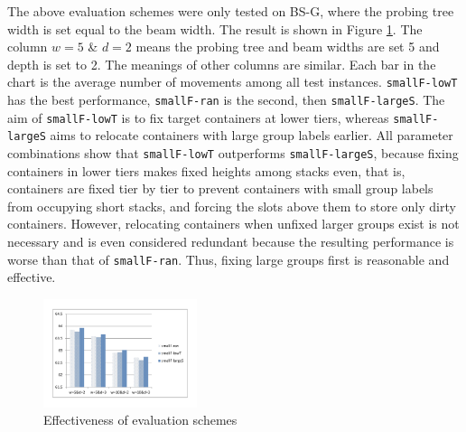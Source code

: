 \documentclass[review,3p,times,authoryear,12pt]{elsarticle}
\begin{document}
The above evaluation schemes were only tested on BS-G, where the probing tree width is set equal to the beam width. The result is shown in Figure \ref{fig7}. The column $w=5$ \& $d=2$ means the probing tree and beam widths are set 5 and depth is set to 2. The meanings of other columns are similar. Each bar in the chart is the average number of movements among all test instances. \texttt{smallF-lowT} has the best performance, \texttt{smallF-ran} is the second, then \texttt{smallF-largeS}. The aim of \texttt{smallF-lowT} is to fix target containers at lower tiers, whereas \texttt{smallF-largeS} aims to relocate containers with large group labels earlier. All parameter combinations show that \texttt{smallF-lowT} outperforms \texttt{smallF-largeS}, because fixing containers in lower tiers makes fixed heights among stacks even, that is, containers are fixed tier by tier to prevent containers with small group labels from occupying short stacks, and forcing the slots above them to store only dirty containers. However, relocating containers when unfixed larger groups exist is not necessary and is even considered redundant because the resulting performance is worse than that of \texttt{smallF-ran}. Thus, fixing large groups first is reasonable and effective.
\begin{figure}[htbp]
\centering
\includegraphics[width=0.4\textwidth]{fig7.pdf}
\caption{Effectiveness of evaluation schemes}
\label{fig7}
\end{figure}
\end{document}
